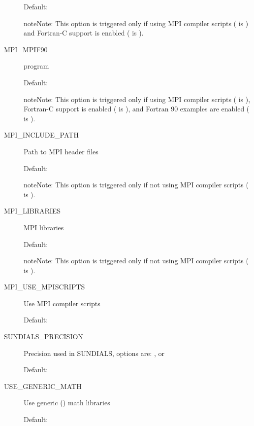 \documentclass[letterpaper,10pt,english]{sphinxmanual}
\begin{document}
\begin{description}
Default: 

\begin{notice}{note}{Note:}
This option is triggered only if using MPI compiler scripts
( is ) and Fortran-C support is enabled
( is ).
\end{notice}

\item[{\index{MPI\_MPIF90 (CMake option)}MPI\_MPIF90}] \leavevmode
{} program

Default:

\begin{notice}{note}{Note:}
This option is triggered only if using MPI compiler scripts
( is ), Fortran-C support is enabled
( is ), and Fortran 90 examples are enabled
( is ).
\end{notice}

\item[{\index{MPI\_INCLUDE\_PATH (CMake option)}MPI\_INCLUDE\_PATH}] \leavevmode
Path to MPI header files

Default: 

\begin{notice}{note}{Note:}
This option is triggered only if not using MPI compiler
scripts ( is ).
\end{notice}

\item[{\index{MPI\_LIBRARIES (CMake option)}MPI\_LIBRARIES}] \leavevmode
MPI libraries

Default: 

\begin{notice}{note}{Note:}
This option is triggered only if not using MPI compiler
scripts ( is ).
\end{notice}

\item[{\index{MPI\_USE\_MPISCRIPTS (CMake option)}MPI\_USE\_MPISCRIPTS}] \leavevmode
Use MPI compiler scripts

Default: 

\item[{\index{SUNDIALS\_PRECISION (CMake option)}SUNDIALS\_PRECISION}] \leavevmode
Precision used in SUNDIALS, options are: ,  or

Default: 

\item[{\index{USE\_GENERIC\_MATH (CMake option)}USE\_GENERIC\_MATH}] \leavevmode
Use generic () math libraries

Default: 

\end{description}
\end{document}
